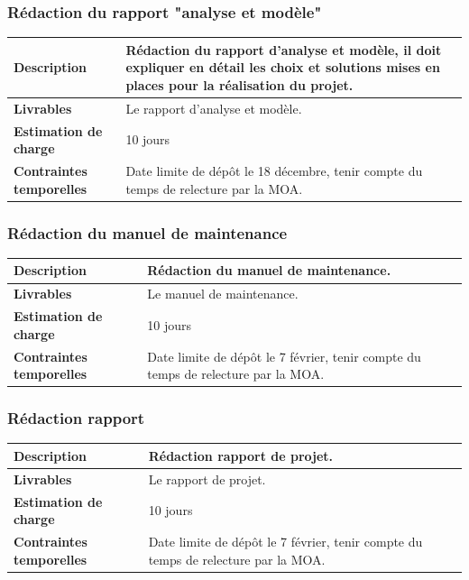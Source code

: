 \subsubsection{Rédaction du rapport "analyse et modèle"}

\begin{tabularx}{13cm}{lX}
    \toprule
        \textbf{Description} &
        Rédaction du rapport d'analyse et modèle, il doit expliquer en détail les choix et solutions mises en places pour la réalisation du projet. \\
    \midrule
        \textbf{Livrables} &
        Le rapport d'analyse et modèle. \\
    \midrule
        \textbf{Estimation de charge} &
        10 jours \\
    \midrule
        \textbf{Contraintes temporelles} &
        Date limite de dépôt le 18 décembre, tenir compte du temps de relecture par la MOA. \\
    \bottomrule
\end{tabularx}

\subsubsection{Rédaction du manuel de maintenance}

\begin{tabularx}{13cm}{lX}
    \toprule
        \textbf{Description} &
        Rédaction du manuel de maintenance. \\
    \midrule
        \textbf{Livrables} &
        Le manuel de maintenance. \\
    \midrule
        \textbf{Estimation de charge} &
        10 jours \\
    \midrule
        \textbf{Contraintes temporelles} &
        Date limite de dépôt le 7 février, tenir compte du temps de relecture par la MOA. \\
    \bottomrule
\end{tabularx}

\subsubsection{Rédaction rapport}

\begin{tabularx}{13cm}{lX}
    \toprule
        \textbf{Description} &
        Rédaction rapport de projet. \\
    \midrule
        \textbf{Livrables} &
        Le rapport de projet. \\
    \midrule
        \textbf{Estimation de charge} &
        10 jours \\
    \midrule
        \textbf{Contraintes temporelles} &
        Date limite de dépôt le 7 février, tenir compte du temps de relecture par la MOA. \\
    \bottomrule
\end{tabularx}

